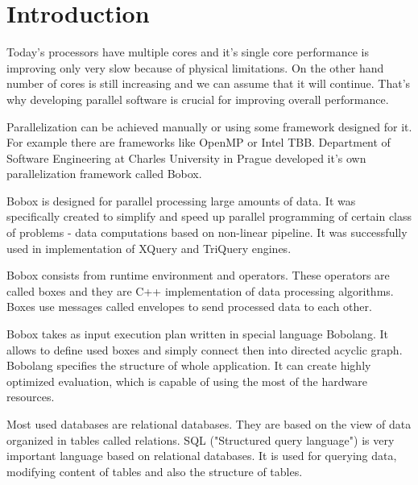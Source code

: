 \chapter{Introduction}
Today's processors have multiple cores and it's single core performance is improving only very slow because of physical limitations. On the other hand number of cores is still increasing and we can assume that it will continue. That's why developing parallel software is crucial for improving overall performance.

Parallelization can be achieved manually or using some framework designed for it. For example there are frameworks like OpenMP or Intel TBB. Department of Software Engineering at Charles University in Prague developed it's own parallelization framework called Bobox\cite{bobox}.

Bobox is designed for parallel processing large amounts of data. It was specifically created to simplify and speed up parallel programming of certain class of problems - data computations based on non-linear pipeline. It was successfully used in implementation of XQuery and TriQuery engines.

Bobox consists from runtime environment and operators. These operators are called boxes and they are C++ implementation of data processing algorithms. Boxes use messages called envelopes to send processed data to each other. 

Bobox takes as input execution plan written in special language Bobolang\cite{bobolang}. It allows to define used boxes and simply connect then into directed acyclic graph. Bobolang specifies the structure of whole application. It can create highly optimized evaluation, which is capable of using the most of the hardware resources.

Most used databases are relational databases. They are based on the view of data organized in tables called relations. SQL\cite{database} ("Structured query language") is very important language based on relational databases. It is used for querying data, modifying content of tables and also the structure of tables.

